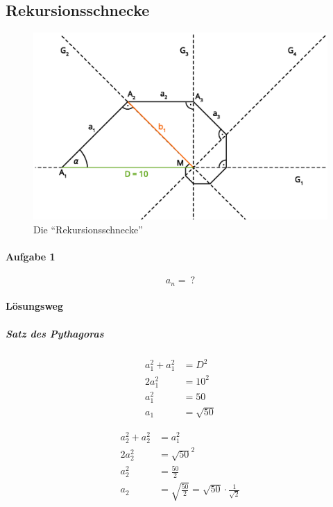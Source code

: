 \subsection{Rekursionsschnecke}

\begin{figure}[H]
	\centering
	\includegraphics[scale=0.6]{grafiken/Rekursionsschnecke.eps}
	\caption{Die \enquote{Rekursionsschnecke}}\label{fig:rekusionsschnecke}
\end{figure}

\paragraph{Aufgabe 1}

\[
	a_n =\ ?
\]

\paragraph{Lösungsweg}

\subparagraph{Satz des Pythagoras}

\begin{align*}
	a_1^2 + a_1^2 & = D^2       \\
	2 a_1^2       & = 10^2      \\
	a_1^2         & = 50        \\
	a_1           & = \sqrt{50}
\end{align*}

\begin{align*}
	a_2^2 + a_2^2 & = a_1^2                                                    \\
	2 a_2^2       & = {\sqrt{50}}^2                                            \\
	a_2^2         & = \frac{50}{2}                                             \\
	a_2           & = \sqrt{\frac{50}{2}} = \sqrt{50} \cdot \frac{1}{\sqrt{2}}
\end{align*}

